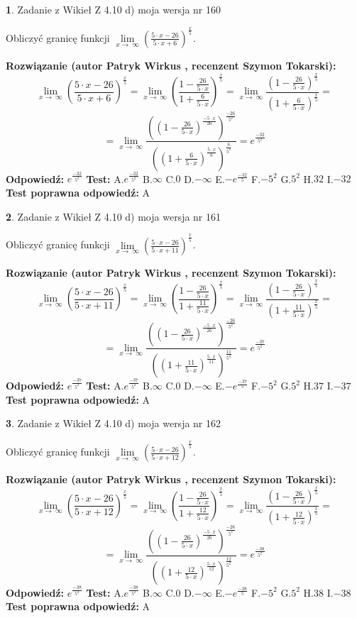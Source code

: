 \documentclass[12pt, a4paper]{article}
\theoremstyle{definition} %
\newtheorem{zad}{}
\newcommand{\zadStart}[1]{\begin{zad}#1\newline}
\newcommand{\zadStop}{\end{zad}}
\newcommand{\rozwStart}[2]{\noindent \textbf{Rozwiązanie (autor #1 , recenzent #2): }\newline}
\newcommand{\rozwStop}{\newline}
\newcommand{\odpStart}{\noindent \textbf{Odpowiedź:}\newline}
\newcommand{\odpStop}{\newline}
\newcommand{\testStart}{\noindent \textbf{Test:}\newline}
\newcommand{\testStop}{\newline}
\newcommand{\kluczStart}{\noindent \textbf{Test poprawna odpowiedź:}\newline}
\newcommand{\kluczStop}{\newline}
\begin{document}
\zadStart{Zadanie z Wikieł Z 4.10 d) moja wersja nr 160}


Obliczyć granicę funkcji  $\lim\limits_{x\to\ \infty}(\frac{5\cdot x-26}{5\cdot x+6})^{\frac{x}{5}}$.
\zadStop
\rozwStart{Patryk Wirkus}{Szymon Tokarski}
$$\lim\limits_{x\to\ \infty}(\frac{5\cdot x-26}{5\cdot x+6})^{\frac{x}{5}} = \lim\limits_{x\to\ \infty}(\frac{1-\frac{26}{5\cdot x}}{1+\frac{6}{5\cdot x}})^{\frac{x}{5}}=\lim\limits_{x\to\ \infty}\frac{(1-\frac{26}{5\cdot x})^{\frac{x}{5}}}{(1+\frac{6}{5\cdot x})^{\frac{x}{5}}}=$$
$$=\lim\limits_{x\to\ \infty}\frac{((1-\frac{26}{5\cdot x})^{\frac{-5\cdot x}{26}})^{\frac{-26}{5^{2}}}}{((1+\frac{6}{5\cdot x})^{\frac{5\cdot x}{6}})^{\frac{6}{5^{2}}}}=e^{\frac{-32}{5^{2}}}$$
\rozwStop
\odpStart
$e^{\frac{-32}{5^{2}}}$
\odpStop
\testStart
A.$e^{\frac{-32}{5^{2}}}$ B.$\infty$ C.$0$ D.$-\infty$ E.$-e^{\frac{-32}{5}}$
F.$-5^{2}$ G.$5^{2}$
H.$32$
I.$-32$
\testStop
\kluczStart
A
\kluczStop



\zadStart{Zadanie z Wikieł Z 4.10 d) moja wersja nr 161}


Obliczyć granicę funkcji  $\lim\limits_{x\to\ \infty}(\frac{5\cdot x-26}{5\cdot x+11})^{\frac{x}{5}}$.
\zadStop
\rozwStart{Patryk Wirkus}{Szymon Tokarski}
$$\lim\limits_{x\to\ \infty}(\frac{5\cdot x-26}{5\cdot x+11})^{\frac{x}{5}} = \lim\limits_{x\to\ \infty}(\frac{1-\frac{26}{5\cdot x}}{1+\frac{11}{5\cdot x}})^{\frac{x}{5}}=\lim\limits_{x\to\ \infty}\frac{(1-\frac{26}{5\cdot x})^{\frac{x}{5}}}{(1+\frac{11}{5\cdot x})^{\frac{x}{5}}}=$$
$$=\lim\limits_{x\to\ \infty}\frac{((1-\frac{26}{5\cdot x})^{\frac{-5\cdot x}{26}})^{\frac{-26}{5^{2}}}}{((1+\frac{11}{5\cdot x})^{\frac{5\cdot x}{11}})^{\frac{11}{5^{2}}}}=e^{\frac{-37}{5^{2}}}$$
\rozwStop
\odpStart
$e^{\frac{-37}{5^{2}}}$
\odpStop
\testStart
A.$e^{\frac{-37}{5^{2}}}$ B.$\infty$ C.$0$ D.$-\infty$ E.$-e^{\frac{-37}{5}}$
F.$-5^{2}$ G.$5^{2}$
H.$37$
I.$-37$
\testStop
\kluczStart
A
\kluczStop



\zadStart{Zadanie z Wikieł Z 4.10 d) moja wersja nr 162}


Obliczyć granicę funkcji  $\lim\limits_{x\to\ \infty}(\frac{5\cdot x-26}{5\cdot x+12})^{\frac{x}{5}}$.
\zadStop
\rozwStart{Patryk Wirkus}{Szymon Tokarski}
$$\lim\limits_{x\to\ \infty}(\frac{5\cdot x-26}{5\cdot x+12})^{\frac{x}{5}} = \lim\limits_{x\to\ \infty}(\frac{1-\frac{26}{5\cdot x}}{1+\frac{12}{5\cdot x}})^{\frac{x}{5}}=\lim\limits_{x\to\ \infty}\frac{(1-\frac{26}{5\cdot x})^{\frac{x}{5}}}{(1+\frac{12}{5\cdot x})^{\frac{x}{5}}}=$$
$$=\lim\limits_{x\to\ \infty}\frac{((1-\frac{26}{5\cdot x})^{\frac{-5\cdot x}{26}})^{\frac{-26}{5^{2}}}}{((1+\frac{12}{5\cdot x})^{\frac{5\cdot x}{12}})^{\frac{12}{5^{2}}}}=e^{\frac{-38}{5^{2}}}$$
\rozwStop
\odpStart
$e^{\frac{-38}{5^{2}}}$
\odpStop
\testStart
A.$e^{\frac{-38}{5^{2}}}$ B.$\infty$ C.$0$ D.$-\infty$ E.$-e^{\frac{-38}{5}}$
F.$-5^{2}$ G.$5^{2}$
H.$38$
I.$-38$
\testStop
\kluczStart
A
\kluczStop
\end{document}
